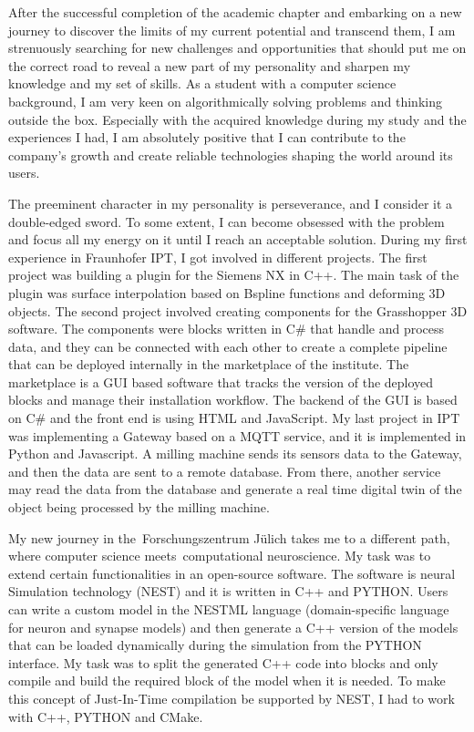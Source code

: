 
After the successful completion of the academic chapter and embarking on a new journey to discover the limits of my current potential and transcend them, I am strenuously searching for new challenges and opportunities that should put me on the correct road to reveal a new part of my personality and sharpen my knowledge and my set of skills. As a student with a computer science background, I am very keen on algorithmically solving problems and thinking outside the box. Especially with the acquired knowledge during my study and the experiences I had, I am absolutely positive that I can contribute to the company's growth and create reliable technologies shaping the world around its users.

The preeminent character in my personality is perseverance, and I consider it a double-edged sword. To some extent, I can become obsessed with the problem and focus all my energy on it until I reach an acceptable solution. During my first experience in Fraunhofer IPT, I got involved in different projects. The first project was  building a plugin for the Siemens NX in C++. The main task of the plugin was surface interpolation based on Bspline functions and deforming 3D objects. The second project involved creating components  for the Grasshopper 3D software. The components were blocks written in C\# that handle and process data, and they can be connected with each other to create a complete pipeline that can be deployed internally in the marketplace of the institute. The marketplace is a GUI based software that tracks the version of the deployed blocks and manage their installation workflow. The backend of the GUI is based on C\# and the front end is using HTML and JavaScript. My last project in IPT was implementing a Gateway based on a MQTT service, and it is implemented in Python and Javascript. A milling machine sends its sensors data to the Gateway, and then the data are sent to a remote database. From there, another service may  read the data from the database and generate a real time digital twin of the object being processed by the milling machine.


My new journey in the Forschungszentrum Jülich takes me to a different path, where computer science meets computational neuroscience. My task was to extend certain functionalities in an open-source software. The software is neural Simulation technology (NEST) and it is written in C++ and PYTHON. Users can write a custom model in the NESTML language (domain-specific language for neuron and synapse models) and then generate a C++ version of the models that can be loaded dynamically during the simulation from the PYTHON interface. My task was to split the generated C++ code into blocks and only compile and build the required block of the model when it is needed. To make this concept of Just-In-Time compilation be supported by NEST, I had to work with C++, PYTHON and CMake.

